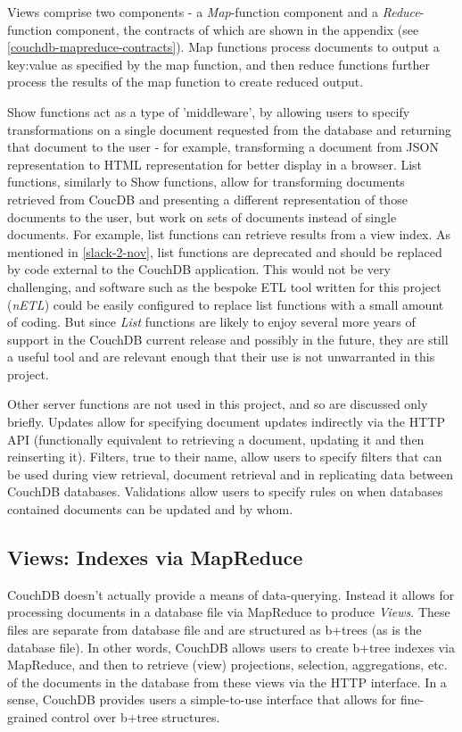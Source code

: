 Views comprise two components - a \textit{Map}-function component and a \textit{Reduce}-function component, the contracts of which are shown in the appendix (see \ref{couchdb-mapreduce-contracts}). Map functions process documents to output a key:value as specified by the map function, and then reduce functions further process the results of the map function to create reduced output.

Show functions act as a type of 'middleware', by allowing users to specify transformations on a single document requested from the database and returning that document to the user - for example, transforming a document from JSON representation to HTML representation for better display in a browser. List functions, similarly to Show functions, allow for transforming documents retrieved from CoucDB and presenting a different representation of those documents to the user, but work on sets of documents instead of single documents. For example, list functions can retrieve results from a view index. As mentioned in \ref{slack-2-nov}, list functions are deprecated and should be replaced by code external to the CouchDB application. This would not be very challenging, and software such as the bespoke ETL tool written for this project (\textit{nETL}) could be easily configured to replace list functions with a small amount of coding. But since \textit{List} functions are likely to enjoy several more years of support in the CouchDB current release and possibly in the future, they are still a useful tool and are relevant enough that their use is not unwarranted in this project.

Other server functions are not used in this project, and so are discussed only briefly. Updates allow for specifying document updates indirectly via the HTTP API (functionally equivalent to retrieving a document, updating it and then reinserting it). Filters, true to their name, allow users to specify filters that can be used during view retrieval, document retrieval and in replicating data between CouchDB databases. Validations allow users to specify rules on when databases contained documents can be updated and by whom.

\subsection{Views: Indexes via MapReduce}
CouchDB doesn't actually provide a means of data-querying. Instead it allows for processing documents in a database file via MapReduce to produce \textit{Views}. These files are separate from database file and are structured as b+trees (as is the database file). In other words, CouchDB allows users to create b+tree indexes via MapReduce, and then to retrieve (view) projections, selection, aggregations, etc. of the documents in the database from these views via the HTTP interface. In a sense, CouchDB provides users a simple-to-use interface that allows for fine-grained control over b+tree structures.

